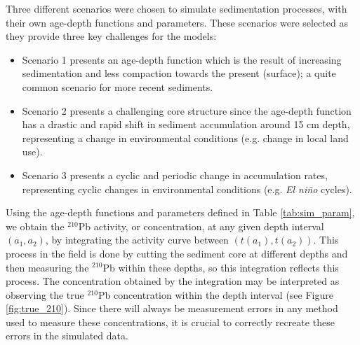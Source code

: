 \documentclass [10pt] {article}
\begin{document}
Three different scenarios were chosen to simulate sedimentation processes, with their own age-depth functions and parameters. 
These scenarios were selected as they provide three key challenges for the models:
\begin{itemize}
	\item Scenario 1 presents an age-depth function which is the result of increasing sedimentation and less compaction towards the present (surface); a quite common scenario for more recent sediments. 
	
	\item Scenario 2 presents a challenging core structure since the age-depth function has a drastic and rapid shift in sediment accumulation around 15 cm depth, representing a change in environmental conditions (e.g. change in local land use).
 
	\item Scenario 3 presents a cyclic and periodic change in accumulation rates, representing cyclic changes in environmental conditions (e.g. \textit{El ni\~no} cycles). 
\end{itemize} 

Using the age-depth functions and parameters defined in Table \ref{tab:sim_param}, we obtain the $^{210}$Pb activity, or concentration, at any given depth interval $(a_1,a_2)$, by integrating the activity curve between $(t(a_1),t(a_2))$.  
This process in the field is done by cutting the sediment core at different depths and then measuring the $^{210}$Pb within these depths, so this integration reflects this process.
The concentration obtained by the integration may be interpreted as observing the true $^{210}$Pb concentration within the depth interval
(see Figure \ref{fig:true_210}).
Since there will always be measurement errors in any method used to measure these concentrations, it is crucial to correctly recreate these errors in the simulated data.

 
\end{document}
